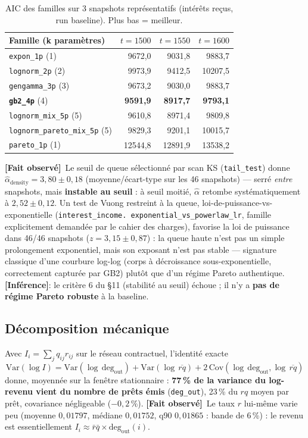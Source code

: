 \documentclass[11pt,a4paper]{article}
\newcommand{\code}[1]{\texttt{#1}}
\newcommand{\fait}{\textbf{[Fait observé]}}
\newcommand{\inference}{\textbf{[Inférence]}}
\begin{document}
\begin{table}[h]
\centering
\caption{AIC des familles sur 3 snapshots représentatifs (intérêts reçus,
run baseline). Plus bas = meilleur.}
\label{tab:aic}
\begin{tabular}{lrrr}
\toprule
Famille (k paramètres) & $t=1500$ & $t=1550$ & $t=1600$ \\
\midrule
\code{expon\_1p} (1) & 9672,0 & 9031,8 & 9883,7 \\
\code{lognorm\_2p} (2) & 9973,9 & 9412,5 & 10207,5 \\
\code{gengamma\_3p} (3) & 9673,2 & 9030,0 & 9883,7 \\
\textbf{\code{gb2\_4p}} (4) & \textbf{9591,9} & \textbf{8917,7} & \textbf{9793,1} \\
\code{lognorm\_mix\_5p} (5) & 9610,8 & 8971,4 & 9809,8 \\
\code{lognorm\_pareto\_mix\_5p} (5) & 9829,3 & 9201,1 & 10015,7 \\
\code{pareto\_1p} (1) & 12544,8 & 12891,9 & 13538,2 \\
\bottomrule
\end{tabular}
\end{table}

\fait\ Le seuil de queue sélectionné par scan KS (\code{tail\_test}) donne
$\hat\alpha_{\mathrm{density}}=3{,}80\pm0{,}18$ (moyenne/écart-type sur les
46 snapshots) --- serré \emph{entre} snapshots, mais \textbf{instable au
seuil} : à seuil moitié, $\hat\alpha$ retombe systématiquement à
$2{,}52\pm0{,}12$. Un test de Vuong restreint à la queue,
loi-de-puissance-vs-exponentielle (\code{interest\_income.
exponential\_vs\_powerlaw\_lr}, famille explicitement demandée par le
cahier des charges), favorise la loi de puissance dans 46/46 snapshots
($z=3{,}15\pm0{,}87$) : la queue haute n'est pas un simple prolongement
exponentiel, mais son exposant n'est pas stable --- signature classique
d'une courbure log-log (corps à décroissance sous-exponentielle,
correctement capturée par GB2) plutôt que d'un régime Pareto authentique.
\inference : le critère 6 du §11 (stabilité au seuil) échoue ; il n'y a
\textbf{pas de régime Pareto robuste} à la baseline.

\subsection{Décomposition mécanique}

Avec $I_i=\sum_j q_{ij}r_{ij}$ sur le réseau contractuel, l'identité exacte
\[
\mathrm{Var}(\log I)=\mathrm{Var}(\log\,\mathrm{deg}_{\mathrm{out}})
+\mathrm{Var}(\log\,\overline{rq})
+2\,\mathrm{Cov}(\log\,\mathrm{deg}_{\mathrm{out}},\log\,\overline{rq})
\]
donne, moyennée sur la fenêtre stationnaire : \textbf{77\,\% de la variance
du log-revenu vient du nombre de prêts émis} (\code{deg\_out}), 23\,\% du
$rq$ moyen par prêt, covariance négligeable ($-0{,}2\,\%$). \fait\ Le taux
$r$ lui-même varie peu (moyenne $0{,}01797$, médiane $0{,}01752$, q90
$0{,}01865$ : bande de $6\,\%$) : le revenu est essentiellement
$I_i\approx \bar{r}\bar{q}\times\mathrm{deg}_{\mathrm{out}}(i)$.
\end{document}
